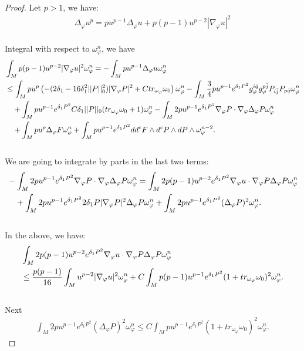 \documentclass[11pt]{amsart}
\numberwithin{equation}{section}
\begin{document}
\begin{proof}
\noindent
Let $p>1$,  we have:
\begin{align}
	\Delta_\varphi u^p = p u^{p-1}\Delta_\varphi u+p(p-1)u^{p-2}|\nabla_\varphi u|^2
\end{align}\\
Integral with respect to $\omega_\varphi^n$, we have
\begin{align}
	&\int_M p(p-1)u^{p-2}|\nabla_{\varphi}u|^2\omega_{\varphi}^n = - \int_M pu^{p-1}\Delta_\varphi u \omega_\varphi^n  \notag \\
	&\le \int_M pu^p\left( -(2\delta_1-16\delta_1^2||P||_0^2)|\nabla_{\varphi}P|^2+Ctr_{\omega_{\varphi}}\omega_0\right) \omega_{\varphi}^n - \int_M\frac{3}{4} pu^{p-1}e^{\delta_1P^2}g_{\varphi}^{i\bar{q}}g_{\varphi}^{p\bar{j}}P_{i\bar{j}}P_{p\bar{q}}\omega_{\varphi}^n \notag \\
	&\quad + \int_M pu^{p-1}e^{\delta_1P^2} C\delta_1||P||_0 (tr_{\omega_{\varphi}}\omega_0+1)\omega_\varphi^n      -\int_M2pu^{p-1}e^{\delta_1P^2}\nabla_{\varphi}P\cdot \nabla_{\varphi}\Delta_{\varphi}P\omega_{\varphi}^n \notag \\
	&\quad +\int_M pu^p\Delta_{\varphi}F\omega_{\varphi}^n + \int_M pu^{p-1}e^{\delta_1P^2}dd^cF\wedge d^cP\wedge dP\wedge \omega_{\varphi}^{n-2}.
\end{align}\\
We are going to integrate by parts in the last two terms:
\begin{align}
	&-\int_M2pu^{p-1}e^{\delta_1P^2}\nabla_{\varphi}P\cdot \nabla_{\varphi}\Delta_{\varphi}P\omega_{\varphi}^n =\int_M2p(p-1)u^{p-2}e^{\delta_1P^2}\nabla_{\varphi}u\cdot \nabla_{\varphi}P\Delta_{\varphi}P\omega_{\varphi}^n \notag \\
	&\quad+\int_M2pu^{p-1}e^{\delta_1P^2}2\delta_1 P |\nabla_{\varphi}P|^2 \Delta_{\varphi}P\omega_{\varphi}^n + \int_M2pu^{p-1}e^{\delta_1P^2}(\Delta_{\varphi}P)^2\omega_{\varphi}^n.
\end{align}\\
In the above,  we have:
\begin{align}
	&\int_M2p(p-1)u^{p-2}e^{\delta_1P^2}\nabla_{\varphi}u\cdot \nabla_{\varphi}P\Delta_{\varphi}P\omega_{\varphi}^n \notag \\
	&\le \frac{p(p-1)}{16}\int_Mu^{p-2}|\nabla_{\varphi}u|^2\omega_{\varphi}^n+C \int_M p(p-1)u^{p-1}e^{\delta_1P^2}(1+tr_{\omega_{\varphi}}\omega_0)^2\omega_{\varphi}^n.
\end{align}\\
Next
\begin{align}
	\int_M2pu^{p-1}e^{\delta_1P^2}(\Delta_{\varphi}P)^2\omega_{\varphi}^n\le C \int_M pu^{p-1}e^{\delta_1P^2}(1+tr_{\omega_{\varphi}}\omega_0)^2\omega_{\varphi}^n.

\end{align}
\end{proof}
\end{document}
